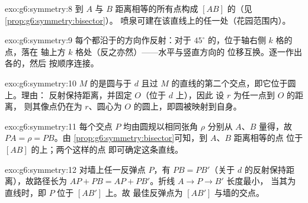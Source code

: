 \begin{solution}{exo:g6:symmetry:8}
到 $A$ 与 $B$ 距离相等的所有点构成
$[AB]$ 的（见\cref{prop:g6:symmetry:bisector}）。
喷泉可建在该直线上的任一处（花园范围内）。
\end{solution}

\begin{solution}{exo:g6:symmetry:9}
每个都沿于的方向作反射：对于
$45^\circ$ 的，位于轴右侧 $k$ 格的点，落在
轴上方 $k$ 格处（反之亦然）——水平与竖直方向的
位移互换。逐一作出各的，然后
按顺序连接。
\end{solution}

\begin{solution}{exo:g6:symmetry:10}
$M$ 的是圆与于
$d$ 且过 $M$ 的直线的第二个交点，即它位于圆上。理由：
反射保持距离，并固定 $O$（位于 $d$ 上），因此
设 $r$ 为任一点到 $O$ 的距离，
则其像点仍在为 $r$、圆心为 $O$ 的圆上，即圆被映射到自身。
\end{solution}

\begin{solution}{exo:g6:symmetry:11}
每个交点 $P$ 均由圆规以相同张角 $\rho$
分别从 $A$、$B$ 量得，故 $PA = \rho = PB$。由
\cref{prop:g6:symmetry:bisector}可知，到 $A$、$B$ 距离相等的点
位于 $[AB]$ 的上；两个这样的点
即可确定这条直线。
\end{solution}

\begin{solution}{exo:g6:symmetry:12}
对墙上任一反弹点 $P$，有 $PB = PB'$（关于
$d$ 的反射保持距离），故路径长为
$AP + PB = AP + PB'$。折线 $A \to P \to B'$ 长度最小，
当其为直线时，即 $P$ 位于 $[AB']$ 上。故
最佳反弹点为 $[AB']$ 与墙的交点。
\end{solution}

